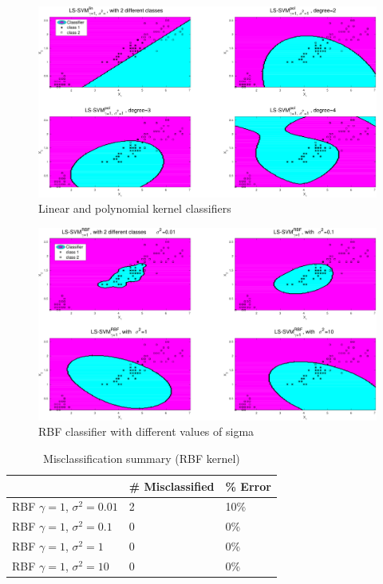 \documentclass[11pt, a4paper]{article}
\begin{document}
\begin{figure}[H]
    \centering
    \includegraphics[scale=.40]{iris_linpol.pdf}
    \caption{Linear and polynomial kernel classifiers}
    \label{fig:iris_linpol}
\end{figure}


\begin{figure}[H]
    \centering
    \includegraphics[scale=.40]{iris_rbf.pdf}
    \caption{RBF classifier with different values of sigma}
    \label{fig:iris_linpol}
\end{figure}

\begin{table}[]
  \centering
  \begin{tabular}{l|l|l|}
    \cline{2-3}
    & \# Misclassified & \% Error \\ \hline
    \multicolumn{1}{|l|}{RBF $\gamma=1$, $\sigma^2=0.01$} & 2                 & 10\%     \\ \hline
    \multicolumn{1}{|l|}{RBF $\gamma=1$, $\sigma^2=0.1$}  & 0                 & 0\%      \\ \hline
    \multicolumn{1}{|l|}{RBF $\gamma=1$, $\sigma^2=1$}    & 0                 & 0\%      \\ \hline
    \multicolumn{1}{|l|}{RBF $\gamma=1$, $\sigma^2=10$}   & 0                 & 0\%      \\ \hline
  \end{tabular}
  \label{table:iris_rbf}
  \caption{Misclassification summary (RBF kernel)}
\end{table}
\end{document}
